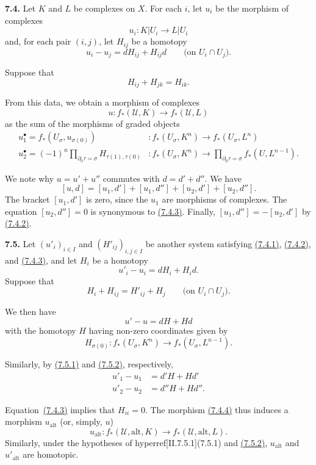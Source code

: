 \documentclass{report}
\newenvironment{rmenv}[1]
  {\phantomsection\par\medskip\noindent\textbf{#1.}\rmfamily}
  {\par\medskip}
\renewcommand{\cal}[1]{{\mathcal{#1}}}
\newcommand{\alt}{\mathrm{alt}}
\newcommand{\oldpage}[1]{\marginpar{\footnotesize$\Big\vert$ \textit{p.~#1}}}
\begin{document}
\begin{rmenv}{7.4}
\label{II.7.4}
  Let $K$ and $L$ be complexes on $X$.
  For each $i$, let $u_i$ be the morphism of complexes
  \[
  \label{II.7.4.1}
    u_i\colon K|U_i \to L|U_i
  \tag{7.4.1}
  \]
  and, for each pair $(i,j)$, let $H_{ij}$ be a homotopy
  \[
  \label{II.7.4.2}
    u_i - u_j = d H_{ij} + H_{ij}d
    \qquad\mbox{(on $U_i\cap U_j$).}
  \tag{7.4.2}
  \]

  Suppose that
  \[
  \label{II.7.4.3}
    H_{ij} + H_{jk} = H_{ik}.
  \tag{7.4.3}
  \]

  From this data, we obtain a morphism of complexes
  \[
  \label{II.7.4.4}
    u\colon f_*(\cal{U},K) \to f_*(\cal{U},L)
  \tag{7.4.4}
  \]
  as the sum of the morphisms of graded objects
  \[
    \begin{aligned}
      u_1^\bullet = f_*(U_\sigma,u_{\sigma(0)})
      &\colon f_*(U_\sigma,K^n) \to f_*(U_\sigma,L^n)
    \\u_2^\bullet = (-1)^n\prod_{\partial_0\tau=\sigma} H_{\tau(1),\tau(0)}
    &\colon f_*(U_\sigma,K^n) \to \prod_{\partial_0\tau=\sigma} f_*(U,L^{n-1}).
    \end{aligned}
  \]

  We note why $u=u'+u''$ commutes with $d=d'+d''$.
  We have
  \oldpage{115}
  \[
    [u,d] = [u_1,d'] + [u_1,d''] + [u_2,d'] + [u_2,d''].
  \]
  The bracket $[u_1,d']$ is zero, since the $u_1$ are morphisms of complexes.
  The equation $[u_2,d'']=0$ is synonymous to \hyperref[II.7.4.3]{(7.4.3)}.
  Finally, $[u_1,d'']=-[u_2,d']$ by \hyperref[II.7.4.2]{(7.4.2)}.
\end{rmenv}

\begin{rmenv}{7.5}
\label{II.7.5}
  Let $(u'_i)_{i\in I}$ and $(H'_{ij})_{i,j\in I}$ be another system satisfying \hyperref[II.7.4.1]{(7.4.1)}, \hyperref[II.7.4.2]{(7.4.2)}, and \hyperref[II.7.4.3]{(7.4.3)}, and let $H_i$ be a homotopy
  \[
  \label{II.7.5.1}
    u'_i - u_i = dH_i + H_id.
  \tag{7.5.1}
  \]
  Suppose that
  \[
  \label{II.7.5.2}
    H_i + H_{ij} = H'_{ij} + H_j
    \qquad\mbox{(on $U_i\cap U_j$).}
  \tag{7.5.2}
  \]

  We then have
  \[
    u'-u = dH+Hd
  \]
  with the homotopy $H$ having non-zero coordinates given by
  \[
    H_{\sigma(0)}\colon f_*(U_\sigma,K^n) \to f_*(U_\sigma,L^{n-1}).
  \]

  Similarly, by \hyperref[II.7.5.1]{(7.5.1)} and \hyperref[II.7.5.2]{(7.5.2)}, respectively,
  \[
    \begin{aligned}
      u'_1 - u_1 &= d'H + Hd'
    \\u'_2 - u_2 &= d''H + Hd''.
    \end{aligned}
  \]

  Equation~\hyperref[II.7.4.3]{(7.4.3)} implies that $H_{ii}=0$.
  The morphism \hyperref[II.7.4.4]{(7.4.4)} thus induces a morphism $u_\alt$ (or, simply, $u$)
  \[
  \label{II.7.5.3}
    u_\alt\colon f_*(\cal{U},\alt,K) \to f_*(\cal{U},\alt,L).
  \tag{7.5.3}
  \]
  Similarly, under the hypotheses of hyperref[II.7.5.1]{(7.5.1)} and \hyperref[II.7.5.2]{(7.5.2)}, $u_\alt$ and $u'_\alt$ are homotopic.
\end{rmenv}
\end{document}
